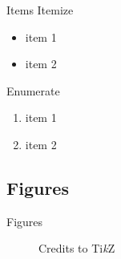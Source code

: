 \documentclass[compress]{beamer}
\begin{document}
\begin{frame}{Items}
  Itemize
  \begin{itemize}
    \item item 1
    \item item 2
  \end{itemize}

  \bigskip

  Enumerate
  \begin{enumerate}
    \item item 1
    \item item 2
  \end{enumerate}
\end{frame}

\subsection{Figures}

\begin{frame}{Figures}
  \begin{figure}
    \centering
    \caption{Credits to Ti\textit{k}Z}
  \end{figure}
\end{frame}
\end{document}
